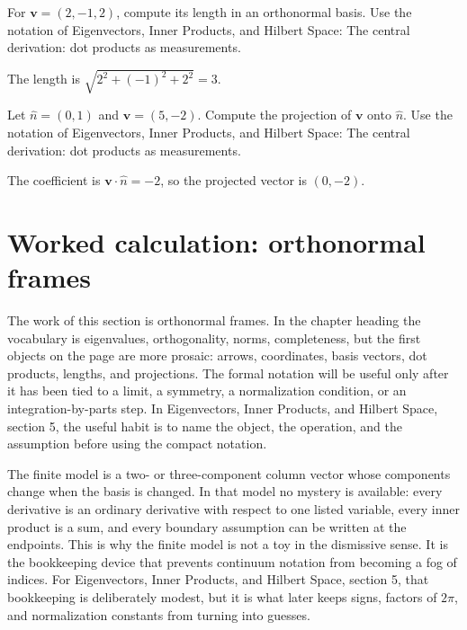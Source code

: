 \begin{exercise}
For \(\bm v=(2,-1,2)\), compute its length in an orthonormal basis.  Use the notation of Eigenvectors, Inner Products, and Hilbert Space: The central derivation: dot products as measurements.
\begin{answer}
The length is \(\sqrt{2^2+(-1)^2+2^2}=3\).
\end{answer}
\end{exercise}

\begin{exercise}
Let \(\hat n=(0,1)\) and \(\bm v=(5,-2)\).  Compute the projection of \(\bm v\) onto \(\hat n\).  Use the notation of Eigenvectors, Inner Products, and Hilbert Space: The central derivation: dot products as measurements.
\begin{answer}
The coefficient is \(\bm v\cdot\hat n=-2\), so the projected vector is \((0,-2)\).
\end{answer}
\end{exercise}



\section{Worked calculation: orthonormal frames}

The work of this section is orthonormal frames.  In the chapter heading the vocabulary is eigenvalues, orthogonality, norms, completeness, but the first objects on the page are more prosaic: arrows, coordinates, basis vectors, dot products, lengths, and projections.  The formal notation will be useful only after it has been tied to a limit, a symmetry, a normalization condition, or an integration-by-parts step.  In Eigenvectors, Inner Products, and Hilbert Space, section 5, the useful habit is to name the object, the operation, and the assumption before using the compact notation.

The finite model is a two- or three-component column vector whose components change when the basis is changed.  In that model no mystery is available: every derivative is an ordinary derivative with respect to one listed variable, every inner product is a sum, and every boundary assumption can be written at the endpoints.  This is why the finite model is not a toy in the dismissive sense.  It is the bookkeeping device that prevents continuum notation from becoming a fog of indices.  For Eigenvectors, Inner Products, and Hilbert Space, section 5, that bookkeeping is deliberately modest, but it is what later keeps signs, factors of \(2\pi\), and normalization constants from turning into guesses.

